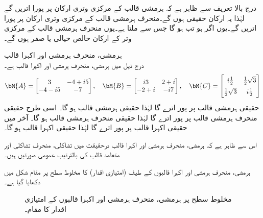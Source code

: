 درج بالا  تعریف سے ظاہر ہے کہ ہرمشی قالب کے مرکزی وتری ارکان  پر پورا اتریں گے  لہٰذا یہ ارکان حقیقی ہوں گے۔منحرف ہرمشی قالب کے مرکزی وتری  ارکان  پر پورا اتریں گے۔یوں اگر  ہو تب   ہو گا جس سے   ملتا ہے۔یوں منحرف ہرمشی قالب کے مرکزی وتر کے ارکان خالص خیالی یا صفر  ہوں گے۔

\quad ہرمشی، منحرف ہرمشی اور اکہرا قالب\\
درج ذیل میں  ہرمشی،  منحرف ہرمشی اور  اکہرا قالب ہے۔
\begin{align*}
\bM{A}=\begin{bmatrix} 3&-4+i5\\-4-i5&-7 \end{bmatrix}, \quad \bM{B}=\begin{bmatrix} i3&2+i\\-2+i&-i7 \end{bmatrix},\quad
\bM{C}=\begin{bmatrix} i\tfrac{1}{2}&\tfrac{1}{2}\sqrt{3}\\[0.5em]\tfrac{1}{2}\sqrt{3}&i\tfrac{1}{2} \end{bmatrix}  
\end{align*}
حقیقی ہرمشی قالب  پر پور اترے گا لہٰذا حقیقی ہرمشی قالب  ہو گا۔ اسی طرح حقیقی منحرف ہرمشی قالب
  پر پور اترے گا لہٰذا حقیقی منحرف ہرمشی قالب  ہو گا۔ آخر میں حقیقی اکہرا  قالب
  پر پور اترے گا لہٰذا حقیقی اکہرا قالب  ہو گا۔ 

اس سے ظاہر ہے کہ  ہرمشی،  منحرف ہرمشی اور اکہرا قالب درحقیقت میں تشاکلی، منحرف تشاکلی اور متعامد قالب کی بالترتیب عمومی صورتیں ہیں۔

ہرمشی، منحرف ہرمشی اور اکہرا قالبوں کے طیف (امتیازی اقدار) کا مخلوط  سطح پر مقام شکل  میں دکھایا گیا ہے۔
\begin{figure}
\centering
{}
\caption{مخلوط  سطح پر ہرمشی، منحرف ہرمشی اور اکہرا قالبوں کے امتیازی اقدار کا مقام۔}
\label{شکل_امتیازی_مخلوط_سطح_مقام}
\end{figure}

